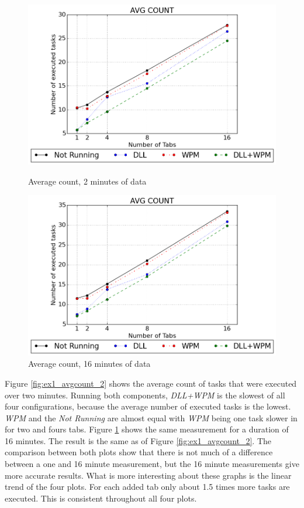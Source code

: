 \begin{figure}[!htbp]
	\centering
    \includegraphics[width=\textwidth,height=0.45\textheight,keepaspectratio]{Evaluation/experiment1/AVG-COUNT-2.png}
    \caption{Average count, 2 minutes of data}
    \label{fig:ex1_avgcount_2}

  	\vspace*{\floatsep}
  	
    \includegraphics[width=\textwidth,height=0.45\textheight,keepaspectratio]{Evaluation/experiment1/AVG-COUNT-16.png}
    \caption{Average count, 16 minutes of data}
    \label{fig:ex1_avgcount_16}
\end{figure}
Figure \ref{fig:ex1_avgcount_2} shows the average count of tasks that were executed over two minutes. Running both components, \emph{\gls{DLL}+\gls{WPM}} is the slowest of all four configurations, because the average number of executed tasks is the lowest. \emph{WPM} and the \emph{Not Running} are almost equal with \emph{\gls{WPM}} being one task slower in for two and fours tabs. Figure \ref{fig:ex1_avgcount_16} shows the same measurement for a duration of 16 minutes. The result is the same as of Figure \ref{fig:ex1_avgcount_2}. The comparison between both plots show that there is not much of a difference between a one and 16 minute measurement, but the 16 minute measurements give more accurate results. What is more interesting about these graphs is the linear trend of the four plots. For each added tab only about 1.5 times more tasks are executed. This is consistent throughout all four plots.

